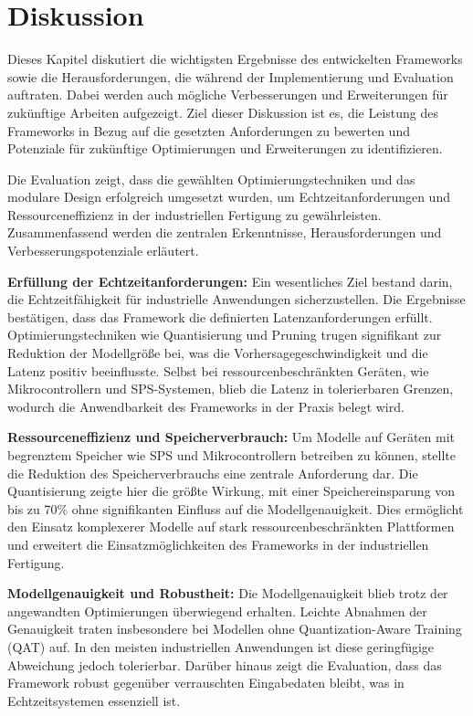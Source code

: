 \chapter{Diskussion}
\label{chap:diskussion}

Dieses Kapitel diskutiert die wichtigsten Ergebnisse des entwickelten Frameworks sowie die Herausforderungen, die während der Implementierung 
und Evaluation auftraten. Dabei werden auch mögliche Verbesserungen und Erweiterungen für zukünftige Arbeiten aufgezeigt. 
Ziel dieser Diskussion ist es, die Leistung des Frameworks in Bezug auf die gesetzten Anforderungen zu bewerten und Potenziale für zukünftige 
Optimierungen und Erweiterungen zu identifizieren.

Die Evaluation zeigt, dass die gewählten Optimierungstechniken und das modulare Design erfolgreich umgesetzt wurden, um 
Echtzeitanforderungen und Ressourceneffizienz in der industriellen Fertigung zu gewährleisten. Zusammenfassend werden die zentralen Erkenntnisse, 
Herausforderungen und Verbesserungspotenziale erläutert.

\textbf{Erfüllung der Echtzeitanforderungen:} Ein wesentliches Ziel bestand darin, die Echtzeitfähigkeit für industrielle Anwendungen 
sicherzustellen. Die Ergebnisse bestätigen, dass das Framework die definierten Latenzanforderungen erfüllt. Optimierungstechniken wie Quantisierung 
und Pruning trugen signifikant zur Reduktion der Modellgröße bei, was die Vorhersagegeschwindigkeit und die Latenz positiv beeinflusste. 
Selbst bei ressourcenbeschränkten Geräten, wie Mikrocontrollern und SPS-Systemen, blieb die Latenz in tolerierbaren Grenzen, wodurch die 
Anwendbarkeit des Frameworks in der Praxis belegt wird.

\textbf{Ressourceneffizienz und Speicherverbrauch:} Um Modelle auf Geräten mit begrenztem Speicher wie SPS und Mikrocontrollern betreiben zu können, 
stellte die Reduktion des Speicherverbrauchs eine zentrale Anforderung dar. Die Quantisierung zeigte hier die größte Wirkung, mit einer Speichereinsparung 
von bis zu 70\% ohne signifikanten Einfluss auf die Modellgenauigkeit. Dies ermöglicht den Einsatz komplexerer Modelle auf stark ressourcenbeschränkten 
Plattformen und erweitert die Einsatzmöglichkeiten des Frameworks in der industriellen Fertigung.

\textbf{Modellgenauigkeit und Robustheit:} Die Modellgenauigkeit blieb trotz der angewandten Optimierungen überwiegend erhalten. 
Leichte Abnahmen der Genauigkeit traten insbesondere bei Modellen ohne Quantization-Aware Training (QAT) auf. In den meisten industriellen Anwendungen 
ist diese geringfügige Abweichung jedoch tolerierbar. Darüber hinaus zeigt die Evaluation, dass das Framework robust gegenüber verrauschten Eingabedaten bleibt, 
was in Echtzeitsystemen essenziell ist.

